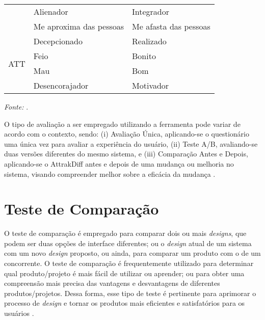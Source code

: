 \begin{table}[h]
\begin{adjustbox}{center}
\begin{tabular}{c|ll}
                         & \multicolumn{1}{l|}{Alienador}               & Integrador            \\ \cline{2-3} 
                         & \multicolumn{1}{l|}{Me aproxima das pessoas} & Me afasta das pessoas \\ \hline
    \multirow{4}{*}{ATT} & \multicolumn{1}{l|}{Decepcionado}            & Realizado             \\ \cline{2-3} 
                         & \multicolumn{1}{l|}{Feio}                    & Bonito                \\ \cline{2-3} 
                         & \multicolumn{1}{l|}{Mau}                     & Bom                   \\ \cline{2-3} 
                         & \multicolumn{1}{l|}{Desencorajador}          & Motivador             \\ \hline
    \end{tabular}
    \end{adjustbox}
    \begin{tablenotes}[flushleft]
      \centering
      \item \textit{Fonte:} \cite{hassenzahl2003}.
    \end{tablenotes}
\end{table}

O tipo de avaliação a ser empregado utilizando a ferramenta pode variar de acordo com o contexto, sendo: (i) Avaliação Única, aplicando-se o questionário uma única vez para avaliar 
a experiência do usuário, (ii) Teste A/B, avaliando-se duas versões diferentes do mesmo sistema, e (iii) Comparação Antes e Depois, aplicando-se o AttrakDiff antes e 
depois de uma mudança ou melhoria no sistema,  visando compreender melhor sobre a eficácia da mudança \cite{nzongo2018}.

\section{Teste de Comparação}
\label{sec:Teste de Comparação}

O teste de comparação é empregado para comparar dois ou mais \textit{designs}, que podem ser duas opções de interface diferentes; ou o \textit{design} atual de um sistema com um novo 
\textit{design} proposto, ou ainda, para comparar um produto com o de um concorrente. O teste de comparação é frequentemente utilizado para determinar qual produto/projeto é mais fácil 
de utilizar ou aprender; ou para obter uma compreensão mais precisa das vantagens e desvantagens de diferentes produtos/projetos. Dessa forma, esse tipo de teste é pertinente para aprimorar 
o processo de \textit{design} e tornar os produtos mais eficientes e satisfatórios para os usuários \cite{rubin2011}.

